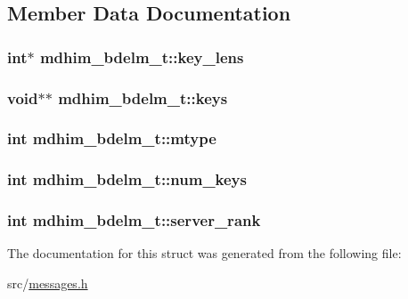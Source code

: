 \subsection{Member Data Documentation}
\hypertarget{structmdhim__bdelm__t_a12057b9c3f79456910521cd628b31415}{
\subsubsection[{key\-\_\-lens}]{\setlength{\rightskip}{0pt plus 5cm}int$\ast$ mdhim\-\_\-bdelm\-\_\-t\-::key\-\_\-lens}}\label{d4/ddf/structmdhim__bdelm__t_a12057b9c3f79456910521cd628b31415}
\hypertarget{structmdhim__bdelm__t_a7e218a41a470e47c65040491f879985d}{
\subsubsection[{keys}]{\setlength{\rightskip}{0pt plus 5cm}void$\ast$$\ast$ mdhim\-\_\-bdelm\-\_\-t\-::keys}}\label{d4/ddf/structmdhim__bdelm__t_a7e218a41a470e47c65040491f879985d}
\hypertarget{structmdhim__bdelm__t_a9723fe671281596fa43c80b13ea7eb9c}{
\subsubsection[{mtype}]{\setlength{\rightskip}{0pt plus 5cm}int mdhim\-\_\-bdelm\-\_\-t\-::mtype}}\label{d4/ddf/structmdhim__bdelm__t_a9723fe671281596fa43c80b13ea7eb9c}
\hypertarget{structmdhim__bdelm__t_a78c759571c75ac6472ebbd20fadbc7b4}{
\subsubsection[{num\-\_\-keys}]{\setlength{\rightskip}{0pt plus 5cm}int mdhim\-\_\-bdelm\-\_\-t\-::num\-\_\-keys}}\label{d4/ddf/structmdhim__bdelm__t_a78c759571c75ac6472ebbd20fadbc7b4}
\hypertarget{structmdhim__bdelm__t_a5c455aeb5d7804c4d448d5b3f624c6e6}{
\subsubsection[{server\-\_\-rank}]{\setlength{\rightskip}{0pt plus 5cm}int mdhim\-\_\-bdelm\-\_\-t\-::server\-\_\-rank}}\label{d4/ddf/structmdhim__bdelm__t_a5c455aeb5d7804c4d448d5b3f624c6e6}


The documentation for this struct was generated from the following file\-:\begin{DoxyCompactItemize}
\item 
src/\hyperlink{messages_8h}{messages.\-h}\end{DoxyCompactItemize}
